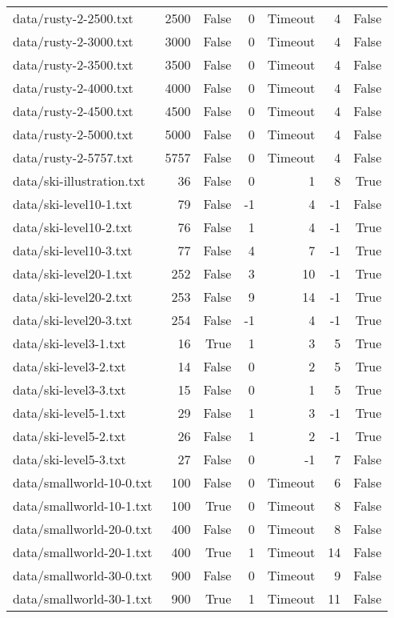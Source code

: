 \begin{tabular}{lrrrrrr}
data/rusty-2-2500.txt & 2500 & False & 0 & Timeout & 4 & False \\
data/rusty-2-3000.txt & 3000 & False & 0 & Timeout & 4 & False \\
data/rusty-2-3500.txt & 3500 & False & 0 & Timeout & 4 & False \\
data/rusty-2-4000.txt & 4000 & False & 0 & Timeout & 4 & False \\
data/rusty-2-4500.txt & 4500 & False & 0 & Timeout & 4 & False \\
data/rusty-2-5000.txt & 5000 & False & 0 & Timeout & 4 & False \\
data/rusty-2-5757.txt & 5757 & False & 0 & Timeout & 4 & False \\
data/ski-illustration.txt & 36 & False & 0 & 1 & 8 & True \\
data/ski-level10-1.txt & 79 & False & -1 & 4 & -1 & False \\
data/ski-level10-2.txt & 76 & False & 1 & 4 & -1 & True \\
data/ski-level10-3.txt & 77 & False & 4 & 7 & -1 & True \\
data/ski-level20-1.txt & 252 & False & 3 & 10 & -1 & True \\
data/ski-level20-2.txt & 253 & False & 9 & 14 & -1 & True \\
data/ski-level20-3.txt & 254 & False & -1 & 4 & -1 & True \\
data/ski-level3-1.txt & 16 & True & 1 & 3 & 5 & True \\
data/ski-level3-2.txt & 14 & False & 0 & 2 & 5 & True \\
data/ski-level3-3.txt & 15 & False & 0 & 1 & 5 & True \\
data/ski-level5-1.txt & 29 & False & 1 & 3 & -1 & True \\
data/ski-level5-2.txt & 26 & False & 1 & 2 & -1 & True \\
data/ski-level5-3.txt & 27 & False & 0 & -1 & 7 & False \\
data/smallworld-10-0.txt & 100 & False & 0 & Timeout & 6 & False \\
data/smallworld-10-1.txt & 100 & True & 0 & Timeout & 8 & False \\
data/smallworld-20-0.txt & 400 & False & 0 & Timeout & 8 & False \\
data/smallworld-20-1.txt & 400 & True & 1 & Timeout & 14 & False \\
data/smallworld-30-0.txt & 900 & False & 0 & Timeout & 9 & False \\
data/smallworld-30-1.txt & 900 & True & 1 & Timeout & 11 & False \\

\end{tabular}
